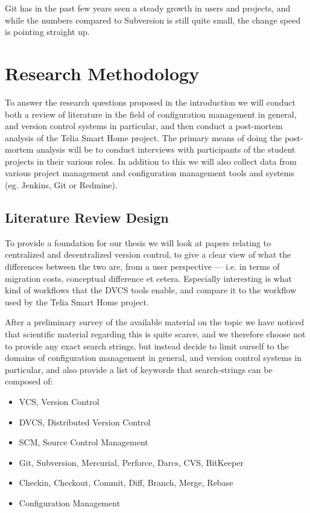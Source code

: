 \documentclass{llncs}
\begin{document}
Git has in the past few years seen a steady growth in users and
projects, and while the numbers compared to Subversion is still quite
small, the change speed is pointing straight up\cite{bird09}.

\section{Research Methodology}

To answer the research questions proposed in the introduction we will
conduct both a review of literature in the field of configuration
management in general, and version control systems in particular, and
then conduct a post-mortem analysis of the Telia Smart Home
project. The primary means of doing the post-mortem analysis will be
to conduct interviews with participants of the student projects in their
various roles. In addition to this we will also collect data from
various project management and configuration management tools and
systems (eg. Jenkins, Git or Redmine).

\subsection{Literature Review Design}

To provide a foundation for our thesis we will look at papers relating
to centralized and decentralized version control, to give a clear view
of what the differences between the two are, from a user perspective
--- i.e. in terms of migration costs, conceptual difference et cetera.
Especially interesting is what kind of workflows that the DVCS tools
enable, and compare it to the workflow used by the Telia Smart Home
project.

After a preliminary survey of the available material on the topic we
have noticed that scientific material regarding this is quite scarce,
and we therefore choose not to provide any exact search strings, but
instead decide to limit ourself to the domains of configuration
management in general, and version control systems in particular, and
also provide a list of keywords that search-strings can be composed
of: 

\begin{itemize}
 \item VCS, Version Control
 \item DVCS, Distributed Version Control
 \item SCM, Source Control Management
 \item Git, Subversion, Mercurial, Perforce, Darcs, CVS, BitKeeper
 \item Checkin, Checkout, Commit, Diff, Branch, Merge, Rebase
 \item Configuration Management
\end{itemize}
\end{document}
